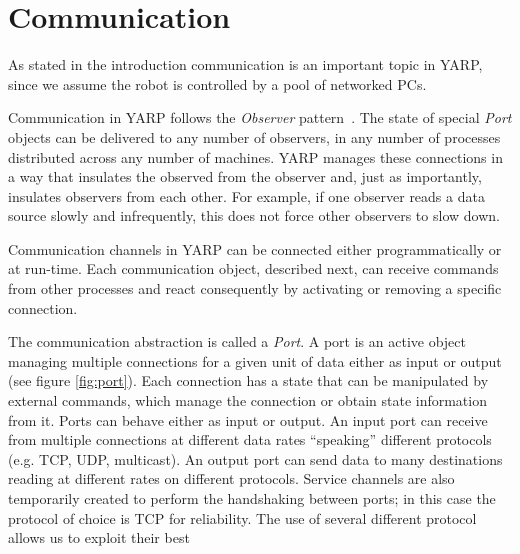 \section{Communication}
\label{sec:communication}

As stated in the introduction communication is an important topic in YARP, since
we assume the robot is controlled by a pool of networked PCs.%

Communication in YARP follows the {\em Observer} pattern~\cite{gamma95design}.  The state
of special {\it Port} objects can be delivered to any number of
observers, in any number of processes distributed across any number of
machines.  YARP manages these connections in a way that insulates
the observed from the observer and, just as importantly, insulates
observers from each other.  For example,
if one observer reads a data source slowly and infrequently, this
does not force other observers to slow down.

Communication channels in YARP can be connected either programmatically or at run-time.
Each communication object, described next, can receive commands from other processes and 
react consequently by activating or removing a specific connection.

The communication abstraction is called a {\em Port}. A port is an active object 
managing multiple connections for a given unit of data either as input or output
(see figure \ref{fig:port}). Each connection has a state that can be manipulated
by external commands, which manage the connection or obtain state information from it. 
Ports can behave either as input or output.
An input port can receive from multiple connections at different data rates 
``speaking'' different protocols (e.g. TCP, UDP, multicast). An output port can 
send data to many destinations reading at different rates on different protocols.
Service channels are also temporarily created to perform the handshaking 
between ports; in this case the protocol of choice is TCP for reliability. 
The use of several different protocol allows us to exploit their best

